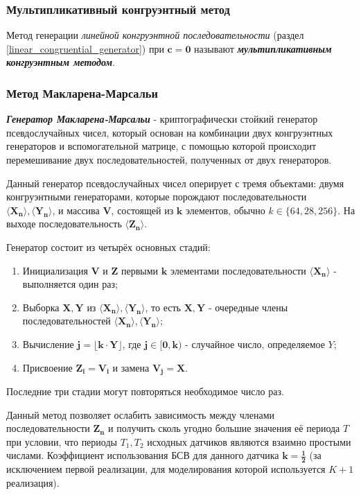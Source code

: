 \subsubsection{Мультипликативный конгруэнтный метод}
Метод генерации \textit{линейной конгруэнтной последовательности} (раздел \ref{linear_congruential_generator}) при $\mathbf{c = 0}$ называют \textbf{\textit{мультипликативным конгруэнтным методом}}.

\subsubsection{Метод Макларена-Марсальи}
\textbf{\textit{Генератор Макларена-Марсальи}} - криптографически стойкий генератор псевдослучайных чисел, который основан на комбинации двух конгруэнтных генераторов и вспомогательной матрице, с помощью которой происходит перемешивание двух последовательностей, полученных от двух генераторов.

Данный генератор псевдослучайных чисел оперирует с тремя объектами: двумя конгруэнтными генераторами, которые порождают последовательности $\mathbf{\langle X_n \rangle, \langle Y_n \rangle}$, и массива $\mathbf{V}$, состоящей из $\mathbf{k}$ элементов, обычно $k \in \lbrace 64, 28, 256 \rbrace$. На выходе последовательность $\mathbf{\langle Z_n \rangle}$.

Генератор состоит из четырёх основных стадий:
\begin{enumerate}
	\item Инициализация $\mathbf{V}$ и $\mathbf{Z}$ первыми $\mathbf{k}$ элементами последовательности $\mathbf{\langle X_n \rangle}$ - выполняется один раз;
	\item Выборка $\mathbf{X, Y}$ из $\mathbf{\langle X_n \rangle, \langle Y_n \rangle}$, то есть $\mathbf{X, Y}$ - очередные члены последовательностей $\mathbf{\langle X_n \rangle, \langle Y_n \rangle}$;
	\item Вычисление $\mathbf{j = \lfloor k \cdot Y \rfloor}$, где $\mathbf{j \in [0,k)}$ - случайное число, определяемое $Y$;
	\item Присвоение $\mathbf{Z_i=V_i}$ и замена $\mathbf{V_j = X}$.
\end{enumerate}

Последние три стадии могут повторяться необходимое число раз.

Данный метод позволяет ослабить зависимость между членами последовательности $\mathbf{Z_n}$ и получить сколь угодно большие значения её периода $T$ при условии, что периоды $T_1, T_2$ исходных датчиков являются взаимно простыми числами. Коэффициент использования БСВ для данного датчика $\mathbf{k=\frac{1}{2}}$ (за исключением первой реализации, для моделирования которой используется $K+1$ реализация).
